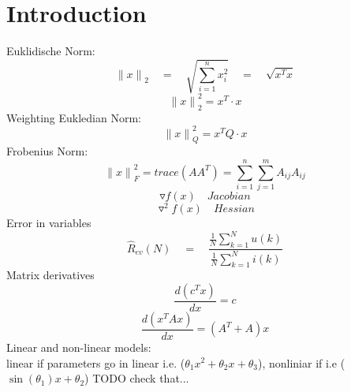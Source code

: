 
\section*{Introduction}
Euklidische Norm: 
\begin{equation*}
{ \parallel x\parallel  }_{ 2 }\quad =\quad \sqrt { \sum _{ i=1 }^{ n }{ { x }_{ i }^{ 2 } }  } \quad =\quad \sqrt { { x }^{ T }x }
\end{equation*}
\begin{equation*}
{\parallel x\parallel  }_{ 2 }^{ 2 } = x^T\cdot x
\end{equation*}
Weighting Eukledian Norm:
\begin{equation*}
{\parallel x\parallel  }_{ Q }^{ 2 } = x^TQ \cdot x
\end{equation*}
Frobenius Norm:
\begin{equation*}
{\parallel x\parallel  }_{ F }^{ 2 } = trace(A{ A }^{ T })=\sum _{ i=1 }^{ n } \sum _{ j=1 }^{ m }{ { A }_{ ij }{ A }_{ ij } } 
\end{equation*}
\begin{equation*}
\triangledown f(x) \quad Jacobian
\end{equation*}
\begin{equation*}
{ \triangledown  }^{ 2 }f(x)\quad Hessian
\end{equation*}
Error in variables
\begin{equation*}
\hat { R } _{ ev }(N)\quad =\quad \frac { \frac { 1 }{ N } \sum _{ k=1 }^{ N }{ u(k) }  }{ \frac { 1 }{ N } \sum _{ k=1 }^{ N }{ i(k) }  }
\end{equation*}
Matrix derivatives
\begin{equation*}
\frac{d(c^Tx)}{dx} = c
\end{equation*} 
\begin{equation*}
\frac{d(x^TAx)}{dx} = (A^T + A)x
\end{equation*} 
Linear and non-linear models:\\
linear if parameters go in linear i.e. ($\theta_1 x^2 + \theta_2 x + \theta_3$), nonliniar if i.e ($\sin(\theta_1)x + \theta_2$) TODO check that...

